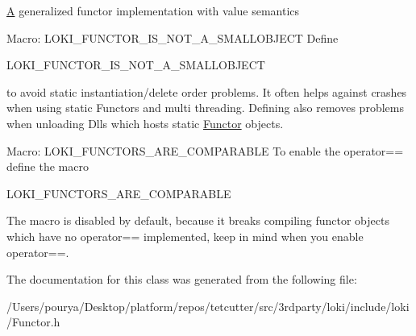 \hyperlink{structA}{A} generalized functor implementation with value semantics

\begin{DoxyParagraph}{Macro\+: L\+O\+K\+I\+\_\+\+F\+U\+N\+C\+T\+O\+R\+\_\+\+I\+S\+\_\+\+N\+O\+T\+\_\+\+A\+\_\+\+S\+M\+A\+L\+L\+O\+B\+J\+E\+C\+T}
Define 
\begin{DoxyCode}
LOKI\_FUNCTOR\_IS\_NOT\_A\_SMALLOBJECT 
\end{DoxyCode}
 to avoid static instantiation/delete order problems. It often helps against crashes when using static Functors and multi threading. Defining also removes problems when unloading Dlls which hosts static \hyperlink{classLoki_1_1Functor}{Functor} objects.
\end{DoxyParagraph}
\begin{DoxyParagraph}{Macro\+: L\+O\+K\+I\+\_\+\+F\+U\+N\+C\+T\+O\+R\+S\+\_\+\+A\+R\+E\+\_\+\+C\+O\+M\+P\+A\+R\+A\+B\+L\+E}
To enable the operator== define the macro 
\begin{DoxyCode}
LOKI\_FUNCTORS\_ARE\_COMPARABLE 
\end{DoxyCode}
 The macro is disabled by default, because it breaks compiling functor objects which have no operator== implemented, keep in mind when you enable operator==. 
\end{DoxyParagraph}


The documentation for this class was generated from the following file\+:\begin{DoxyCompactItemize}
\item 
/\+Users/pourya/\+Desktop/platform/repos/tetcutter/src/3rdparty/loki/include/loki/Functor.\+h\end{DoxyCompactItemize}
